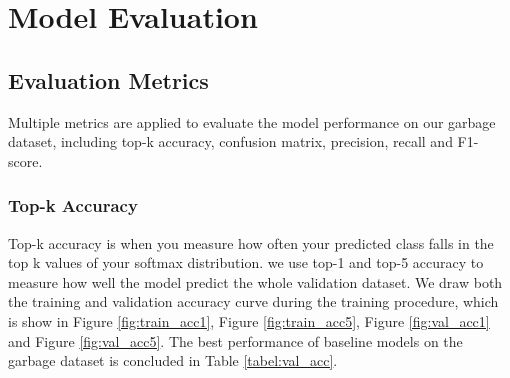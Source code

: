 \section{Model Evaluation}

\subsection{Evaluation Metrics}
Multiple metrics are applied to evaluate the model performance on our garbage dataset, including top-k accuracy, confusion matrix, precision, recall and F1-score.

\subsubsection{Top-k Accuracy}
Top-k accuracy is when you measure how often your predicted class falls in the top k values of your softmax distribution\cite{topk}. we use top-1 and top-5 accuracy to measure how well the model predict the whole validation dataset. We draw both the training and validation accuracy curve during the training procedure, which is show in Figure \ref{fig:train_acc1}, Figure \ref{fig:train_acc5}, Figure \ref{fig:val_acc1} and Figure \ref{fig:val_acc5}. The best performance of baseline models on the garbage dataset is concluded in Table \ref{tabel:val_acc}.

